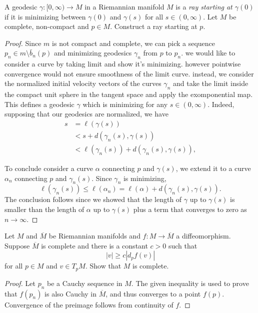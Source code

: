 \begin{exercise}
\label{exercise-ray}
A geodesic $\gamma:[0,\infty) \to M$
in a Riemannian manifold $M$ is a {\it ray
starting at $\gamma(0)$}
if it is minimizing between $\gamma(0)$ and
$\gamma(s)$
for all $s \in (0,\infty)$.
Let $M$ be complete, non-compact and $p \in
M$.
Construct a ray starting at $p$.
\end{exercise}

\begin{proof}
Since $m$ is not compact and complete,
we can pick a sequence $p_n \in m\setminus
\bar{b}_n(p)$
and minimizing geodesics $\gamma_n$ from $p$
to $p_n$.
we would like to consider a curve by taking
limit
and show it's minimizing.
however pointwise convergence would not
ensure smoothness of the limit curve.
instead, we consider the normalized initial
velocity vectors
of the curves $\gamma_n$ and take the limit
inside
the compact unit sphere in the tangent space
and apply the exomponential map.
This defines a geodesic $\gamma$ which
is minimizing for any $s \in (0,\infty)$.
Indeed, supposing that our geodesics
are normalized, we have
$$
\begin{aligned}
s &= \ell(\gamma(s))\\
&< s + d(\gamma_n(s),\gamma(s))\\
&< \ell(\gamma_n(s)) +
d(\gamma_n(s),\gamma(s)),
\end{aligned}
$$

\noindent
To conclude consider a curve $\alpha$
connecting $p$ and $\gamma(s)$,
we extend it to a curve $\alpha_n$ connecting
$p$ and $\gamma_n(s)$.
Since $\gamma_n$ is minimizing,
$$
\ell(\gamma_n(s))\leq \ell(\alpha_n)
=\ell(\alpha)+d(\gamma_n(s),\gamma(s)).
$$
The conclusion follows since we showed that
the
length of $\gamma$ up to $\gamma(s)$
is smaller than the length of $\alpha$ up to
$\gamma(s)$
plus a term that converges to zero as $n\to
\infty$.
\end{proof}

\begin{exercise}
\label{exercise-contraction-and-completeness}
Let $M$ and $\overline{M}$ be Riemannian
manifolds
and $f:M \to \overline{M}$ a diffeomorphism.
Suppose $\overline{M}$ is complete and there
is a constant $c>0$
such that
$$
|v|\geq c|d_pf(v)|
$$
for all $p \in M$ and $v \in T_pM$.
Show that $M$ is complete.
\end{exercise}

\begin{proof}
Let $p_n$ be a Cauchy sequence in $M$.
The given inequality is used to prove
that $f(p_n)$ is also Cauchy in
$\overline{M}$,
and thus converges to a point $f(p)$.
Convergence of the preimage follows from
continuity of $f$.
\end{proof}

